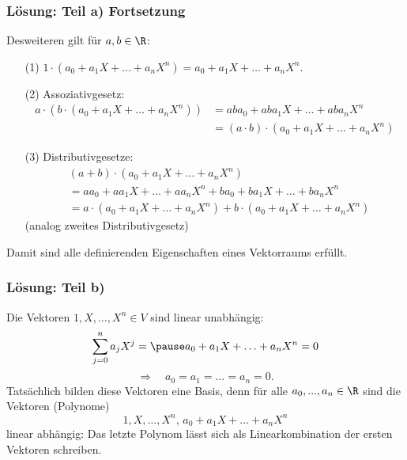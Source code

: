 %
%
\begin{frame}\frametitle{Lösung: Teil a) Fortsetzung}


		Desweiteren gilt für $a,b \in \R$:
		\begin{itemize}
			\item[(1)] $1\cdot (a_0 + a_1X+\ldots + a_nX^n) = a_0 + a_1X+\ldots + a_nX^n$.\pause
			\item[(2)] Assoziativgesetz:
				\begin{align*}
					a\cdot(b\cdot (a_0 + a_1X+\ldots + a_nX^n) ) 
						&= aba_0 + aba_1X+\ldots + aba_nX^n 		\\
						&= (a\cdot b)\cdot (a_0 + a_1X+\ldots + a_nX^n) 
				\end{align*}\pause
			\item[(3)] Distributivgesetze:
				\begin{align*}
						&(a+b)\cdot (a_0 + a_1X+\ldots + a_nX^n)  								\\		
						&= aa_0 + aa_1X+\ldots + aa_nX^n + ba_0 + ba_1X+\ldots + ba_nX^n 			\\
						&= a\cdot(a_0 + a_1X+\ldots + a_nX^n) +  b\cdot(a_0 + a_1X+\ldots + a_nX^n) 
				\end{align*}	\pause
				(analog zweites Distributivgesetz)\pause
		\end{itemize}
		Damit sind alle definierenden Eigenschaften eines Vektorraums erfüllt.
\end{frame}
%
%
\begin{frame} \frametitle{Lösung: Teil b)}
		Die Vektoren $1, X, \ldots, X^n \in V$ sind linear unabh\"angig:
		$$
			\sum_{j=0}^n a_j X^j=\pause a_0 + a_1X+\ldots + a_nX^n = 0 $$\pause
			$$\Rightarrow \quad a_0=a_1=\ldots=a_n=0.
		$$\pause \vfill
		Tats\"achlich bilden diese Vektoren eine Basis, denn für alle $a_0,...,a_n \in \R$ sind die Vektoren (Polynome)
		$$
			1,X, \ldots, X^n,\, a_0 + a_1X + \ldots + a_nX^n
		$$
		linear abh\"angig: Das letzte Polynom l\"asst sich als Linearkombination der ersten Vektoren schreiben.\\

\end{frame}
%
%


